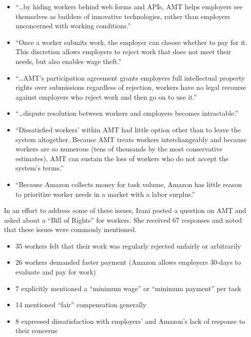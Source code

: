 \begin{itemize}
	\item ``\ldots by hiding workers behind web forms and APIs, AMT helps employers see themselves as builders of innovative technologies, rather than employers unconcerned with working conditions.'' 
	\item ``Once a worker submits work, the employer can choose whether to pay for it. This discretion allows employers to reject work that does not meet their needs, but also enables wage theft.''
	\item ``\ldots AMT's participation agreement grants employers full intellectual property rights over submissions regardless of rejection, workers have no legal recourse against employers who reject work and then go on to use it.''
	\item ``\ldots dispute resolution between workers and employers becomes intractable.''
	\item ``Dissatisfied workers' within AMT had little option other than to leave the system altogether. Because AMT treats workers interchangeably and because workers are so numerous (tens of thousands by the most conservative estimates), AMT can sustain the loss of workers who do not accept the system's terms.''
	\item ``Because Amazon collects money for task volume, Amazon has little reason to prioritize worker needs in a market with a labor surplus.''
\end{itemize}

In an effort to address some of these issues, Irani posted a question on AMT and asked about a ``Bill of Rights'' for workers. She received $ 67 $ responses and noted that these issues were commonly mentioned.

\begin{itemize}
	\item $ 35 $ workers felt that their work was regularly rejected unfairly or arbitrarily
	\item $ 26 $ workers demanded faster payment (Amazon allows employers $ 30 $-days to evaluate and pay for work)
	\item $ 7 $ explicitly mentioned a ``minimum wage'' or ``minimum payment'' per task
	\item $ 14 $ mentioned ``fair'' compensation generally
	\item $ 8 $ expressed dissatisfaction with employers' and Amazon's lack of response to their concerns
\end{itemize}

